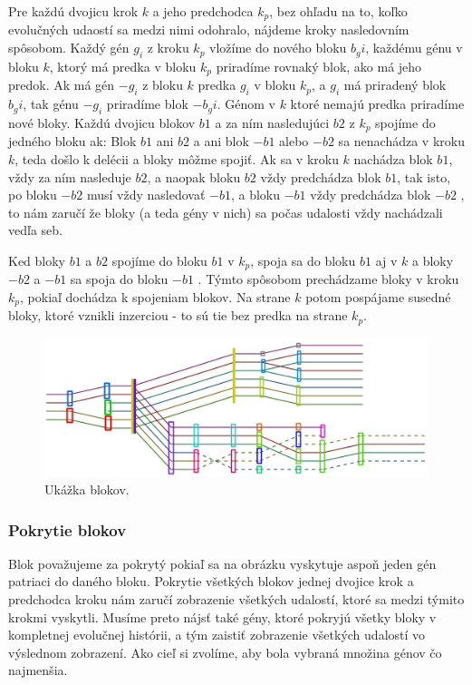 Pre každú dvojicu krok $k$ a jeho predchodca $k_p$, bez ohľadu na to, koľko evolučných udaostí sa medzi nimi odohralo, nájdeme kroky nasledovním spôsobom.
Každý gén $g_i$ z kroku $k_p$ vložíme do nového bloku $b_gi$, každému génu v bloku $k$, ktorý má predka v bloku $k_p$ priradíme rovnaký blok, ako má jeho predok.
Ak má gén $-g_i$ z bloku $k$ predka $g_i$ v bloku $k_p$, a $g_i$ má priradený blok $b_gi$, tak génu $-g_i$ priradíme blok $-b_gi$. 
Génom v $k$ ktoré nemajú predka priradíme nové bloky.
Každú dvojicu blokov $b1$ a za ním nasledujúci $b2$ z $k_p$ spojíme do jedného bloku ak:
Blok $b1$ ani $b2$ a ani blok $-b1$ alebo $-b2$ sa nenachádza v kroku $k$, teda došlo k delécii a bloky môžme spojiť.
Ak sa v kroku $k$ nachádza blok $b1$, vždy za ním nasleduje $b2$, a naopak bloku $b2$ vždy predchádza blok $b1$, tak isto, po bloku $-b2$ musí
vždy nasledovať $-b1$, a bloku $-b1$ vždy predchádza blok $-b2$ , to nám zaručí že bloky (a teda gény v nich) sa počas udalosti vždy nachádzali vedľa seb.

Ked bloky $b1$ a $b2$ spojíme do bloku $b1$ v $k_p$, spoja sa do bloku $b1$ aj v $k$ a bloky $-b2$ a $-b1$ sa spoja do bloku $-b1$ .
Týmto spôsobom prechádzame bloky v kroku $k_p$, pokiaľ dochádza k spojeniam blokov. Na strane $k$ potom pospájame susedné bloky,
ktoré vznikli inzerciou - to sú tie bez predka na strane $k_p$.

\begin{figure}[t]
 \centering
\includegraphics[width=1\textwidth]{images/bloky}
\caption{Ukážka blokov.}\label{obr:bloky}
\end{figure}


\subsubsection{Pokrytie blokov}
Blok považujeme za pokrytý pokiaľ sa na obrázku vyskytuje aspoň jeden gén patriaci do daného bloku.
Pokrytie všetkých blokov jednej dvojice krok a predchodca kroku nám zaručí zobrazenie všetkých udalostí, ktoré sa medzi týmito krokmi vyskytli.
Musíme preto nájsť také gény, ktoré pokryjú všetky bloky v kompletnej evolučnej histórii,
a tým zaistiť zobrazenie všetkých udalostí vo výslednom zobrazení. 
Ako cieľ si zvolíme, aby bola vybraná množina génov čo najmenšia.
